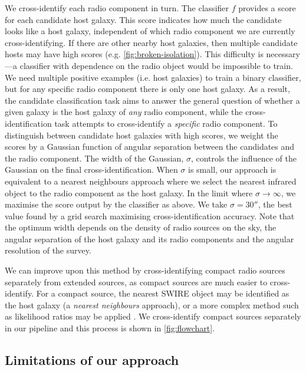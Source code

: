     {We cross-identify each radio component in turn. The classifier $f$
    provides a score for each candidate host galaxy. This score indicates how
    much the candidate looks like a host galaxy, independent of which radio
    component we are currently cross-identifying. If there are other nearby host
    galaxies, then multiple candidate hosts may have high scores (e.g.
    \autoref{fig:broken-isolation}). This difficulty is necessary---a classifier
    with dependence on the radio object would be impossible to train. We
    need multiple positive examples (i.e. host galaxies) to train a binary classifier, but
    for any specific radio component there is only one host galaxy. As a
    result, the candidate classification task aims to answer the general question
    of whether a given galaxy is the host galaxy of \emph{any} radio
    component, while the cross-identification task attempts to cross-identify
    a \emph{specific} radio component. To distinguish between candidate host
    galaxies with high scores, we weight the scores by a Gaussian function of
    angular separation between the candidates and the radio component.} The
    width of the Gaussian, $\sigma$, controls the influence of the Gaussian on
    the final cross-identification. When $\sigma$ is small, our approach is
    equivalent to a nearest neighbours approach where we select the nearest
    infrared object to the radio component as the host galaxy. In the limit
    where $\sigma \to \infty$, we maximise the score output by the
    classifier as above. We take $\sigma = 30''$, the best value
    found by a grid search maximising cross-identification accuracy. {Note that the optimum width depends on
    the density of radio sources on the sky, the angular separation of the
    host galaxy and its radio components and the angular resolution of the survey.}

    {We can improve upon this method by cross-identifying compact radio sources
    separately from extended sources, as compact sources are much easier to
    cross-identify. For a compact source, the nearest SWIRE object may be
    identified as the host galaxy (a \emph{nearest neighbours} approach), or a
    more complex method such as likelihood ratios may be applied
    \citep[see][]{weston18lrpy}. We cross-identify compact sources separately
    in our pipeline and this process is shown in \autoref{fig:flowchart}.}

  \subsection{Limitations of our approach}
    \label{sec:atlas-xid-limitations}

